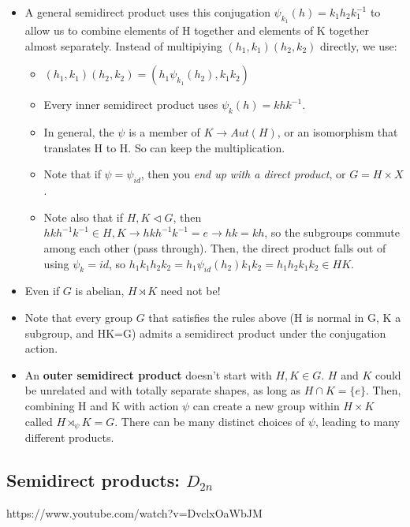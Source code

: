 \documentclass[11pt, oneside]{article}   	%
\begin{document}
\begin{itemize}
\begin{itemize}
 \end{itemize}
 \item A general semidirect product uses this conjugation $\psi_{k_1}(h) = k_1h_2k_1^{-1}$ to allow us to combine elements of H together and elements of K together almost separately.  Instead of multipiying $(h_1, k_1)(h_2, k_2)$ directly, we use:
 \begin{itemize}
 \item $(h_1, k_1)(h_2, k_2) = (h_1 \psi_{k_1}(h_2), k_1k_2)$
 \item Every inner semidirect product uses $\psi_k(h) = khk^{-1}$.
 \item In general, the $\psi$ is a member of $K \rightarrow Aut(H)$, or an isomorphism that translates H to H.  So can keep the multiplication.
 \item Note that if $\psi = \psi_{id}$, then you \emph{end up with a direct product}, or $G = H \times X$.
 \item Note also that if $H, K \triangleleft G$, then $hkh^{-1}k^{-1} \in H, K \rightarrow hkh^{-1}k^{-1} = e \rightarrow hk = kh$, so the subgroups commute among each other (pass through).  Then, the direct product falls out of using $\psi_k = id$, so $h_1k_1h_2k_2 = h_1\psi_{id}(h_2)k_1k_2 = h_1h_2k_1k_2\in HK$.
 \end{itemize}
 \item Even if $G$ is abelian, $H \rtimes K$ need not be! 
 \item Note that every group $G$ that satisfies the rules above (H is normal in G, K a subgroup, and HK=G) admits a semidirect product under the conjugation action.  
 \item An \textbf{outer semidirect product} doesn't start with $H, K \in G$.  $H$ and $K$ could be unrelated and with totally separate shapes, as long as $H  \cap K = \{e\}$.  Then, combining H and K with action $\psi$ can create a new group within $H \times K$ called $H \rtimes_{\psi} K  = G$.  There can be many distinct choices of $\psi$, leading to many different products.
 \end{itemize}
 
 \subsection{Semidirect products: $D_{2n}$}
https://www.youtube.com/watch?v=DvclxOaWbJM
\end{document}
